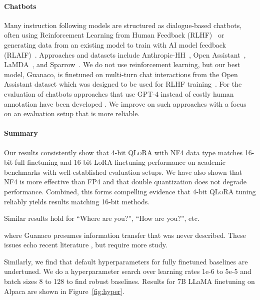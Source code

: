 \paragraph{Chatbots} Many instruction following models are structured as dialogue-based chatbots, often using Reinforcement Learning from Human Feedback (RLHF)~\citep{christiano2017deep} or generating data from an existing model to train with AI model feedback (RLAIF)~\citep{bai2022constitutional}. Approaches and datasets include Anthropic-HH~\citep{askell2021general,bai2022training}, Open Assistant~\citep{kopf2023openassistant}, LaMDA~\citep{thoppilan2022lamda}, and Sparrow~\citep{glaese2022improving}. We do not use reinforcement learning, but our best model, Guanaco, is finetuned on multi-turn chat interactions from the Open Assistant dataset which was designed to be used for RLHF training~\citep{kopf2023openassistant}. For the evaluation of chatbots approaches that use GPT-4 instead of costly human annotation have been developed \citep{vicuna2023,peng2023instruction}. We improve on such approaches with a focus on an evaluation setup that is more reliable.

\paragraph{Summary} Our results consistently show that 4-bit \textsc{QLoRA} with NF4 data type matches 16-bit full finetuning and 16-bit LoRA finetuning performance on academic benchmarks with well-established evaluation setups. We have also shown that NF4 is more effective than FP4 and that double quantization does not degrade performance. Combined, this forms compelling evidence that 4-bit \textsc{QLoRA} tuning reliably yields results matching 16-bit methods. 

Similar results hold for ``Where are you?'', ``How are you?'', etc.

where {Guanaco} presumes information transfer that was never described. These issues echo recent literature \cite{sap2022neural}, but require more study.

Similarly, we find that default hyperparameters for fully finetuned baselines are undertuned. We do a hyperparameter search over learning rates 1e-6 to 5e-5 and batch sizes 8 to 128 to find robust baselines. Results for 7B LLaMA finetuning on Alpaca are shown in Figure~\ref{fig:hyper}.

